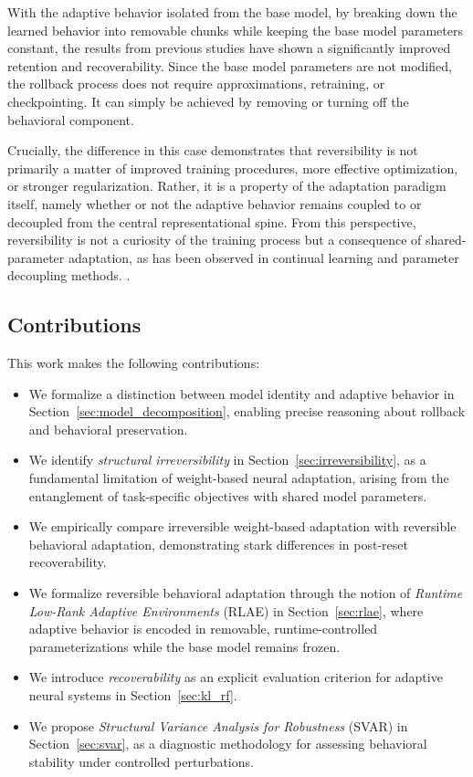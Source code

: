 \documentclass[10pt]{article}
\begin{document}
	With the adaptive behavior isolated from the base model, by breaking down the learned behavior into removable chunks while keeping the base model parameters constant, the results from previous studies \cite{kaushik2021rmn,lanzillotta2023isolation} have shown a significantly improved retention and recoverability. Since the base model parameters are not modified, the rollback process does not require approximations, retraining, or checkpointing. It can simply be achieved by removing or turning off the behavioral component.
	
	Crucially, the difference in this case demonstrates that reversibility is not primarily a matter of improved training procedures, more effective optimization, or stronger regularization. Rather, it is a property of the adaptation paradigm itself, namely whether or not the adaptive behavior remains coupled to or decoupled from the central representational spine. From this perspective, reversibility is not a curiosity of the training process but a consequence of shared-parameter adaptation, as has been observed in continual learning and parameter decoupling methods. \cite{delange2021continual,lanzillotta2023isolation}.
	
	\subsection{Contributions}
	\label{sect:contribution}
	
	This work makes the following contributions:
	\begin{itemize}
		\item We formalize a distinction between model identity and adaptive behavior in Section~\ref{sec:model_decomposition}, enabling precise reasoning about rollback and behavioral preservation.
		\item We identify \emph{structural irreversibility} in Section~\ref{sec:irreversibility}, as a fundamental limitation of weight-based neural adaptation, arising from the entanglement of task-specific objectives with shared model parameters.
		\item We empirically compare irreversible weight-based adaptation with reversible behavioral adaptation, demonstrating stark differences in post-reset recoverability.
		\item We formalize reversible behavioral adaptation through the notion of \emph{Runtime Low-Rank Adaptive Environments} (RLAE) in Section~\ref{sec:rlae}, where adaptive behavior is encoded in removable, runtime-controlled parameterizations while the base model remains frozen.
		\item We introduce \emph{recoverability} as an explicit evaluation criterion for adaptive neural systems in Section~\ref{sec:kl_rf}.
		\item We propose \emph{Structural Variance Analysis for Robustness} (SVAR) in Section~\ref{sec:svar}, as a diagnostic methodology for assessing behavioral stability under controlled perturbations.
	\end{itemize}
	
\end{document}

